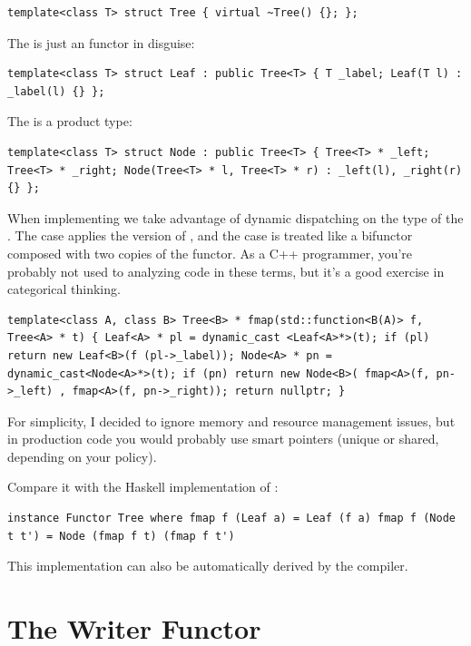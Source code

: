 \begin{verbatim}
template<class T> struct Tree { virtual ~Tree() {}; };
\end{verbatim}

The  is just an  functor in disguise:

\begin{verbatim}
template<class T> struct Leaf : public Tree<T> { T _label; Leaf(T l) : _label(l) {} };
\end{verbatim}

The  is a product type:

\begin{verbatim}
template<class T> struct Node : public Tree<T> { Tree<T> * _left; Tree<T> * _right; Node(Tree<T> * l, Tree<T> * r) : _left(l), _right(r) {} };
\end{verbatim}

When implementing  we take advantage of dynamic dispatching
on the type of the . The  case applies the
 version of , and the  case
is treated like a bifunctor composed with two copies of the
 functor. As a C++ programmer, you're probably not used to
analyzing code in these terms, but it's a good exercise in categorical
thinking.

\begin{verbatim}
template<class A, class B> Tree<B> * fmap(std::function<B(A)> f, Tree<A> * t) { Leaf<A> * pl = dynamic_cast <Leaf<A>*>(t); if (pl) return new Leaf<B>(f (pl->_label)); Node<A> * pn = dynamic_cast<Node<A>*>(t); if (pn) return new Node<B>( fmap<A>(f, pn->_left) , fmap<A>(f, pn->_right)); return nullptr; }
\end{verbatim}

For simplicity, I decided to ignore memory and resource management
issues, but in production code you would probably use smart pointers
(unique or shared, depending on your policy).

Compare it with the Haskell implementation of :

\begin{verbatim}
instance Functor Tree where fmap f (Leaf a) = Leaf (f a) fmap f (Node t t') = Node (fmap f t) (fmap f t')
\end{verbatim}

This implementation can also be automatically derived by the compiler.

\section{The Writer Functor}\label{the-writer-functor}

